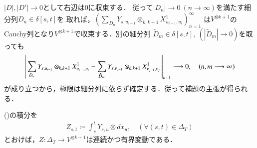 \begin{prf}
		$|D|,|D'|\longrightarrow 0$として右辺は0に収束する．
		従って$|D_n| \longrightarrow 0\ (n \longrightarrow \infty)$を満たす細分列$D_n \in \delta[s,t]$を
		取れば，$\left(\sum_{D_n} Y_{s,u_{i-1}} \otimes_{k,k+1} X^1_{u_{i-1},u_i} \right)_{n=1}^{\infty}$
		は$V^{\otimes k+1}$のCauchy列となり$V^{\otimes k+1}$で収束する．別の細分列
		$\tilde{D}_m \in \delta[s,t],\ (|\tilde{D}_m| \longrightarrow 0)$を取っても
		\begin{align}
			\left|\,  \sum_{D_n} Y_{s,u_{i-1}} \otimes_{k,k+1} X^1_{u_{i-1},u_i} - 
				\sum_{\tilde{D}_m} Y_{s,v_{j-1}} \otimes_{k,k+1} X^1_{v_{j-1},v_j}\, \right|_{k+1}
			\longrightarrow 0,
			\quad (n,m \longrightarrow \infty)
		\end{align}
		が成り立つから，極限は細分列に依らず確定する．従って補題の主張が得られる．
		\QED
	\end{prf}
	
	\begin{screen}
		\begin{lem}\label{lem:signature_of_path}
			()の積分を
			\begin{align}
				Z_{s,t} \coloneqq \int_s^t Y_{s,u} \otimes d x_u,
				\quad (\forall (s,t) \in \Delta_T)
				\label{eq:signature_of_path_1}
			\end{align}
			とおけば，$Z:\Delta_T \longrightarrow V^{\otimes k+1}$は連続かつ有界変動である．
		\end{lem}
	\end{screen}
	
